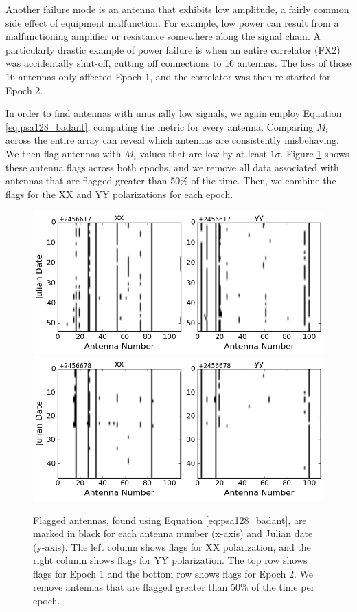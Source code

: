 Another failure mode is an antenna that exhibits low amplitude, a fairly common side effect of equipment malfunction. For example, low power can result from a malfunctioning amplifier or resistance somewhere along the signal chain. A particularly drastic example of power failure is when an entire correlator (FX2) was accidentally shut-off, cutting off connections to 16 antennas. The loss of those 16 antennas only affected Epoch 1, and the correlator was then re-started for Epoch 2. 

In order to find antennas with unusually low signals, we again employ Equation \eqref{eq:psa128_badant}, computing the metric for every antenna. Comparing $M_{i}$ across the entire array can reveal which antennas are consistently misbehaving. We then flag antennas with $M_{i}$ values that are low by at least $1\sigma$. Figure \ref{fig:psa128_badants} shows these antenna flags across both epochs, and we remove all data associated with antennas that are flagged greater than 50\% of the time. Then, we combine the flags for the XX and YY polarizations for each epoch.

\begin{figure}
	\centering
	\includegraphics[trim={0cm 0cm 0cm 0cm},clip,height=0.35\textwidth]{plots/psa128_badants_S1E1.png}
	\includegraphics[trim={0cm 0cm 0cm 0cm},clip,height=0.35\textwidth]{plots/psa128_badants_S1E2.png}
	\caption{Flagged antennas, found using Equation \eqref{eq:psa128_badant}, are marked in black for each antenna number (x-axis) and Julian date (y-axis). The left column shows flags for XX polarization, and the right column shows flags for YY polarization. The top row shows flags for Epoch 1 and the bottom row shows flags for Epoch 2. We remove antennas that are flagged greater than 50\% of the time per epoch.}
	\label{fig:psa128_badants}
\end{figure}

